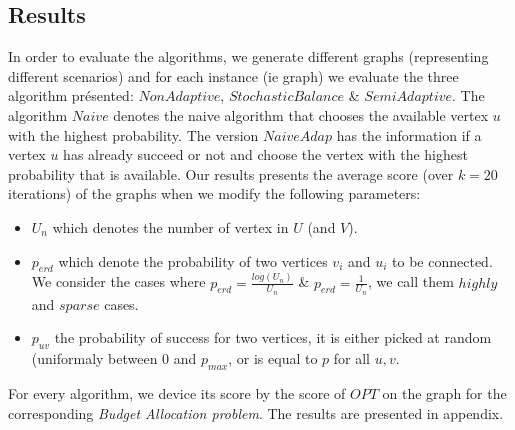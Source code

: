 \documentclass[12pt, twocolumn]{article}
\begin{document}
\subsection{Results}

\par
\hspace{\parindent}In order to evaluate the algorithms, we generate different graphs (representing different scenarios) and for each instance (ie graph) we evaluate the three algorithm présented: $NonAdaptive$, $StochasticBalance$ \& $SemiAdaptive$. The algorithm $Naive$ denotes the naive algorithm that chooses the available vertex $u$ with the highest probability. The version $NaiveAdap$ has the information if a vertex $u$ has already succeed or not and choose the vertex with the highest probability that is available. Our results presents the average score (over $k=20$ iterations) of the graphs when we modify the following parameters:

\begin{itemize}
    \item $U_n$ which denotes the number of vertex in $U$ (and $V$).
    \item $p_{erd}$ which denote the probability of two vertices $v_i$ and $u_i$ to be connected. We consider the cases where $p_{erd} = \frac{log(U_n)}{U_n}$ \& $p_{erd} = \frac{1}{U_n}$, we call them $highly$ and $sparse$ cases.
    \item $p_{uv}$ the probability of success for two vertices, it is either picked at random (uniformaly between 0 and $p_{max}$, or is equal to $p$ for all $u, v$.

\end{itemize}

\par
\hspace{\parindent}For every algorithm, we device its score by the score of $OPT$ on the graph for the corresponding \textit{Budget Allocation problem}. The results are presented in appendix.
\end{document}
